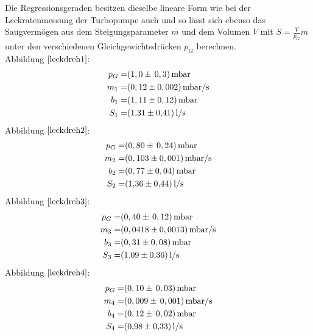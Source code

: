 Die Regressionsgeraden besitzen dieselbe lineare Form wie bei der Leckratenmessung der Turbopumpe auch und so lässt sich ebenso das Saugvermögen
aus dem Steigungsparameter $m$ und dem Volumen $V$ mit $S=\frac{V}{p_G}m$ unter den verschiedenen Gleichgewichtsdrücken $p_G$ berechnen.\\
Abbildung $\ref{leckdreh1}$:
	\begin{align*}
		p_G=& (1,0 \pm \, 0,3)  \, \si{mbar}\\
		m_1=& (0,12 \pm 0,002) \, \si{mbar/s}\\
		b_1=& (1,11 \pm 0,12) \, \si{mbar}\\
		S_1=& \SI{1,31 \pm 0,41}{l/s}
	\end{align*}
	Abbildung $\ref{leckdreh2}$:
		\begin{align*}
			p_G=& (0,80 \pm \, 0,24) \, \si{mbar}\\
			m_2=& (0,103 \pm 0,001) \, \si{mbar/s}\\
			b_2=& (0,77 \pm 0,04) \, \si{mbar}\\
			S_2=& \SI{1,36 \pm 0,44}{l/s}
		\end{align*}
		Abbildung $\ref{leckdreh3}$:
			\begin{align*}
				p_G=& (0,40 \pm \, 0,12) \, \si{mbar}\\
				m_3=& (0,0418 \pm 0,0013)\, \si{mbar/s}\\
				b_3=& (0,31 \pm 0,08) \, \si{mbar}\\
				S_3=& \SI{1,09 \pm 0,36}{l/s}
			\end{align*}
		Abbildung $\ref{leckdreh4}$:
			\begin{align*}
				p_G=& (0,10 \pm \, 0,03) \, \si{mbar}\\
				m_4=& (0,009 \pm \, 0,001) \, \si{mbar/s}\\
				b_4=& (0,12 \pm \, 0,02) \, \si{mbar}\\
				S_4=& \SI{0,98 \pm 0,33}{l/s}
			\end{align*}
